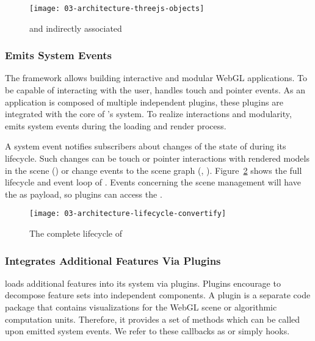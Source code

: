 \documentclass[../../ClassicThesis.tex]{subfiles}
\begin{document}
\begin{figure}[h]
  \centering
  \texttt{[image: 03-architecture-threejs-objects]}
  \caption{ and indirectly associated }
  \label{fig:nodes-and-three}
\end{figure}

\subsubsection{{\convertify} Emits System Events}
\label{convertify-emits-events}

The framework allows building interactive and modular WebGL
applications. To be capable of interacting with the user,
{\convertify} handles touch and pointer events. As an
application is composed of multiple independent plugins,
these plugins are integrated with the core of
{\convertify}'s system. To realize interactions and
modularity, {\convertify} emits system events during the
loading and render process.

A system event notifies subscribers about changes of the
state of {\convertify} during its lifecycle. Such changes
can be touch or pointer interactions with rendered models in
the scene () or change events to the
scene graph (, ).
Figure~\ref{fig:lifecycle} shows the full lifecycle and
event loop of {\convertify}. Events concerning the scene
management will have the  as payload, so plugins
can access the .

\begin{figure}[h]
  \centering
  \texttt{[image: 03-architecture-lifecycle-convertify]}
  \caption{The complete lifecycle of {\convertify}}
  \label{fig:lifecycle}
\end{figure}

\subsubsection{{\convertify} Integrates Additional Features
  Via Plugins}

{\convertify} loads additional features into its system via
plugins. Plugins encourage to decompose feature sets into
independent components. A plugin is a separate code package
that contains visualizations for the WebGL scene or
algorithmic computation units. Therefore, it provides a set
of methods which can be called upon emitted system events.
We refer to these callbacks as  or simply
hooks.
\end{document}
